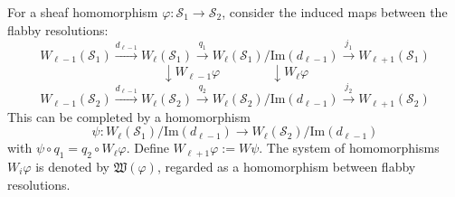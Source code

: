 For a sheaf homomorphism $\varphi: \mathcal{S}_1 \to \mathcal{S}_2$, consider the induced maps between the flabby resolutions:
$$
W_{\ell-1}(\mathcal{S}_1) \xrightarrow{d_{\ell-1}} W_{\ell}(\mathcal{S}_1) \xrightarrow{q_1} W_{\ell}(\mathcal{S}_1) / \text{Im}(d_{\ell-1}) \xrightarrow{j_1} W_{\ell+1}(\mathcal{S}_1)
$$
$$
\downarrow W_{\ell-1}\varphi \qquad \qquad \downarrow W_{\ell}\varphi
$$
$$
W_{\ell-1}(\mathcal{S}_2) \xrightarrow{d_{\ell-1}} W_{\ell}(\mathcal{S}_2) \xrightarrow{q_2} W_{\ell}(\mathcal{S}_2) / \text{Im}(d_{\ell-1}) \xrightarrow{j_2} W_{\ell+1}(\mathcal{S}_2)
$$
This can be completed by a homomorphism
$$\psi: W_{\ell}(\mathcal{S}_1)/\text{Im}(d_{\ell-1}) \to W_{\ell}(\mathcal{S}_2)/\text{Im}(d_{\ell-1})$$
with $\psi \circ q_1 = q_2 \circ W_{\ell}\varphi$. Define $W_{\ell+1}\varphi := W\psi$. The system of homomorphisms $W_i\varphi$ is denoted by $\mathfrak{W}(\varphi)$, regarded as a homomorphism between flabby resolutions.
